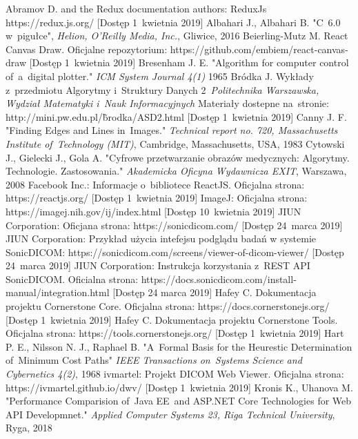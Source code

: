 \documentclass[a4paper,11pt,twoside,openright]{report}
\theoremstyle{definition}
\begin{document}
\begin{thebibliography}{24}
 Abramov D. and the Redux documentation authors: ReduxJs https://redux.js.org/ [Dostęp 1~kwietnia 2019]
 Albahari J., Albahari B. "C~6.0 w~pigułce", \emph{Helion, O'Reilly Media, Inc.}, Gliwice,  2016
 Beierling-Mutz M. React Canvas Draw. Oficjalne repozytorium: https://github.com/embiem/react-canvas-draw [Dostęp 1~kwietnia 2019]
 Bresenham J. E. "Algorithm for computer control of~a~digital plotter." \emph{ICM System Journal 4(1)} 1965
 Bródka J. Wykłady z~przedmiotu Algorytmy i~Struktury Danych 2~\emph{Politechnika Warszawska, Wydział Matematyki i~Nauk Informacyjnych} Materiały dostepne na~stronie: http://mini.pw.edu.pl/\~brodka/ASD2.html [Dostęp 1~kwietnia 2019]
 Canny J. F. "Finding Edges and Lines in~Images." \emph{Technical report no. 720, Massachusetts Institute of~Technology (MIT)}, Cambridge, Massachusetts, USA, 1983
 Cytowski J., Gielecki J., Gola A. "Cyfrowe przetwarzanie obrazów medycznych: Algorytmy. Technologie. Zastosowania." \emph{Akademicka Oficyna Wydawnicza EXIT}, Warszawa, 2008
 Facebook Inc.: Informacje o~bibliotece ReactJS. Oficjalna strona: https://reactjs.org/ [Dostęp 1~kwietnia 2019]
 ImageJ: Oficjalna strona: https://imagej.nih.gov/ij/index.html [Dostęp 10~kwietnia 2019]
 JIUN Corporation: Oficjana strona: https://sonicdicom.com/ [Dostęp 24~marca 2019]
 JIUN Corporation: Przykład użycia intefejsu podglądu badań w systemie SonicDICOM: https://sonicdicom.com/screens/viewer-of-dicom-viewer/ [Dostęp 24~marca 2019]
 JIUN Corporation: Instrukcja korzystania z~REST API SonicDICOM. Oficialna strona: https://docs.sonicdicom.com/install-manual/integration.html [Dostęp 24 marca 2019]
 Hafey C. Dokumentacja projektu Cornerstone Core. Oficjalna strona: https://docs.cornerstonejs.org/ [Dostęp 1~kwietnia 2019]
 Hafey C. Dokumentacja projektu Cornerstone Tools. Oficjalna strona: https://tools.cornerstonejs.org/ [Dostęp 1~kwietnia 2019]
 Hart P. E., Nilsson N. J., Raphael B. "A~Formal Basis for the Heurestic Determination of~Minimum Cost Paths" \emph{IEEE Transactions on~Systems Science and Cybernetics 4(2)}, 1968
 ivmartel: Projekt DICOM Web Viewer. Oficjalna strona: https://ivmartel.github.io/dwv/ [Dostęp 1~kwietnia 2019]
 Kronis K., Uhanova M. "Performance Comparision of~Java EE~and ASP.NET Core Technologies for Web API Developmnet." \emph{Applied Computer Systems 23, Riga Technical University}, Ryga, 2018

\end{thebibliography}
\end{document}
